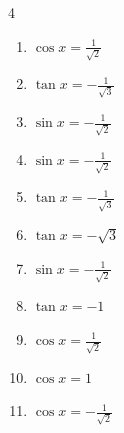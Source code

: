 \begin{multicols}{4}
\begin{enumerate}
  \item $\displaystyle \cos{x}  = \frac{1}{\sqrt{2}}$


  \item $\displaystyle \tan{x}  = -\frac{1}{\sqrt{3}}$


  \item $\displaystyle \sin{x}  = -\frac{1}{\sqrt{2}}$


\columnbreak %

  \item $\displaystyle \sin{x}  = -\frac{1}{\sqrt{2}}$


  \item $\displaystyle \tan{x}  = -\frac{1}{\sqrt{3}}$


  \item $\displaystyle \tan{x}  = -\sqrt{3}$


  \item $\displaystyle \sin{x}  = -\frac{1}{\sqrt{2}}$


  \item $\displaystyle \tan{x}  = -1$


  \item $\displaystyle \cos{x}  = \frac{1}{\sqrt{2}}$


  \item $\displaystyle \cos{x}  = 1$

        \phantom{$\displaystyle x = 0$}

  \item $\displaystyle \cos{x}  = -\frac{1}{\sqrt{2}}$



\end{enumerate}
\end{multicols}
